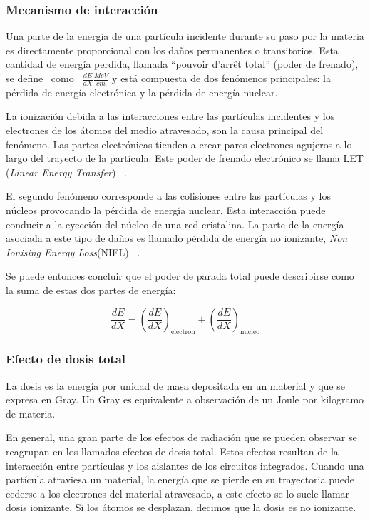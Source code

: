 \subsubsection{Mecanismo de interacción }

Una parte de la energía de una partícula incidente durante su paso por la materia es directamente proporcional con los daños permanentes o transitorios. Esta cantidad de energía perdida, llamada ``pouvoir d'arrêt total'' (poder de frenado), se define ~como ~$\frac{dE}{dX} \frac{MeV}{cm}$  y está compuesta de dos fenómenos principales: la pérdida de energía electrónica y la pérdida de energía nuclear.

La ionización debida a las interacciones entre las partículas incidentes y los electrones de los átomos del medio atravesado, son la causa principal del fenómeno. Las partes electrónicas tienden a  crear pares electrones-agujeros a lo largo del trayecto de la partícula. Este poder de frenado electrónico se llama LET (\textit{Linear Energy Transfer}) ~\cite{4395093}.
	
El segundo fenómeno corresponde a las colisiones entre las partículas y los núcleos provocando la pérdida de energía nuclear. Esta interacción puede conducir a la eyección del núcleo de una red cristalina. La parte de la energía asociada a este tipo de daños es llamado pérdida de energía no ionizante,  \textit{Non Ionising Energy Loss}(NIEL) ~\cite{316523}.

Se puede entonces concluir que el poder de parada total puede describirse como la suma de estas dos partes de energía:

\begin{equation}\label{EQ1}
\frac{dE}{dX}=\left(\frac{dE}{dX}\right)_\text{electron}+\left(\frac{dE}{dX}\right)_\text{nucleo}
\end{equation}

\subsubsection{Efecto de dosis total}

La dosis es la energía por unidad de masa depositada en un material y que se expresa en Gray. Un Gray es equivalente a observación de un Joule por kilogramo de materia.

En general, una gran parte de los efectos de radiación que se pueden observar se  reagrupan en los llamados efectos de dosis total. Estos efectos resultan de la interacción entre partículas y los aislantes de los circuitos integrados. Cuando una partícula atraviesa un material, la energía que se pierde en su trayectoria puede cederse a los electrones del material atravesado, a este efecto se lo suele llamar dosis ionizante. Si los átomos se  desplazan, decimos que la dosis es no ionizante.


